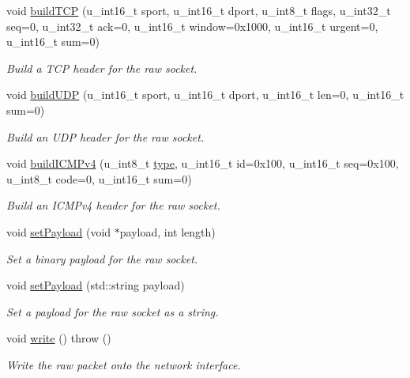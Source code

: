 \begin{CompactItemize}
void \hyperlink{classusock_1_1RawSocket_687afa2e3259ce2bc2cea7cc49db7f14}{buildTCP} (u\_\-int16\_\-t sport, u\_\-int16\_\-t dport, u\_\-int8\_\-t flags, u\_\-int32\_\-t seq=0, u\_\-int32\_\-t ack=0, u\_\-int16\_\-t window=0x1000, u\_\-int16\_\-t urgent=0, u\_\-int16\_\-t sum=0)
\begin{CompactList}\small\item\em Build a TCP header for the raw socket. \item\end{CompactList}\item 
void \hyperlink{classusock_1_1RawSocket_20dc8f4e7c0f5d499517b6410c5dca52}{buildUDP} (u\_\-int16\_\-t sport, u\_\-int16\_\-t dport, u\_\-int16\_\-t len=0, u\_\-int16\_\-t sum=0)
\begin{CompactList}\small\item\em Build an UDP header for the raw socket. \item\end{CompactList}\item 
void \hyperlink{classusock_1_1RawSocket_bf253d275f07db49c00f4b0d8fcf0947}{buildICMPv4} (u\_\-int8\_\-t \hyperlink{classusock_1_1BaseSocket_8117d25c7b482eb594d68137868ce5f9}{type}, u\_\-int16\_\-t id=0x100, u\_\-int16\_\-t seq=0x100, u\_\-int8\_\-t code=0, u\_\-int16\_\-t sum=0)
\begin{CompactList}\small\item\em Build an ICMPv4 header for the raw socket. \item\end{CompactList}\item 
void \hyperlink{classusock_1_1RawSocket_de9254ad3499aebabedad9b861c21bdb}{setPayload} (void $\ast$payload, int length)
\begin{CompactList}\small\item\em Set a binary payload for the raw socket. \item\end{CompactList}\item 
void \hyperlink{classusock_1_1RawSocket_ab429ec3a150c6e15175b3223c90ade6}{setPayload} (std::string payload)
\begin{CompactList}\small\item\em Set a payload for the raw socket as a string. \item\end{CompactList}\item 
void \hyperlink{classusock_1_1RawSocket_e62377b0933a176570f226e1acbe3e16}{write} ()  throw ()
\begin{CompactList}\small\item\em Write the raw packet onto the network interface. \item\end{CompactList}\item 

\end{CompactItemize}
